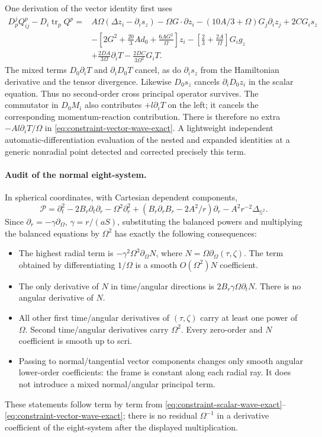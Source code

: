 One derivation of the vector identity first uses
\begin{align}
 D_p^jQ^p_{ij}-D_i\operatorname{tr}_pQ^p
 ={}&A\Omega(\Delta z_i-\partial_i s_z)
 -\Omega G\cdot\partial z_i
 -(10A/3+\Omega)G_j\partial_i z_j+2CG_is_z\\
&-\left[2G^2+\tfrac{20}{3}Ad_0+
                  \tfrac{6AG^2}\Omega\right]z_i
 -\left[\tfrac23+\tfrac{2A}\Omega\right]G_i g_z\\
&+\frac{2DA}{3\Omega}\partial_iT
 -\frac{2DC}{3\Omega^2}G_iT .
\end{align}
The mixed terms $D_0\partial_iT$ and $\partial_iD_0T$ cancel, as do
$\partial_i s_z$ from the Hamiltonian derivative and the tensor divergence.
Likewise $D_0s_z$ cancels $\partial_iD_0z_i$ in the scalar equation. Thus no
second-order cross principal operator survives.
The commutator in $D_0M_i$ also contributes $+l\partial_iT$ on the left;
it cancels the corresponding momentum-reaction contribution. There is
therefore no extra $-Al\partial_iT/\Omega$ in
\eqref{eq:constraint-vector-wave-exact}. A lightweight independent
automatic-differentiation evaluation of the nested and expanded identities
at a generic nonradial point detected and corrected precisely this term.

\paragraph{Audit of the normal eight-system.}
In spherical coordinates, with Cartesian dependent components,
\[
 \mathcal P=\partial_t^2-2B_r\partial_t\partial_r
 -\Omega^2\partial_r^2+
 (B_r\partial_rB_r-2A^2/r)\partial_r
 -A^2r^{-2}\Delta_{\mathbb S^2}.
\]
Since $\partial_r=-\gamma\partial_\Omega$,
$\gamma=r/(aS)$, substituting the balanced powers and multiplying the
balanced equations by $\Omega^2$ has exactly the following consequences:
\begin{itemize}
\item The highest radial term is $-\gamma^2\Omega^3\partial_\Omega N$,
where $N=\Omega\partial_\Omega(\tau,\zeta)$. The term obtained by
differentiating $1/\Omega$ is a smooth $O(\Omega^2)N$ coefficient.
\item The only derivative of $N$ in time/angular directions is
$2B_r\gamma\Omega\partial_tN$. There is no angular derivative of $N$.
\item All other first time/angular derivatives of $(\tau,\zeta)$ carry
at least one power of $\Omega$. Second time/angular derivatives carry
$\Omega^2$. Every zero-order and $N$ coefficient is smooth up to scri.
\item Passing to normal/tangential vector components changes only smooth
angular lower-order coefficients: the frame is constant along each radial
ray. It does not introduce a mixed normal/angular principal term.
\end{itemize}
These statements follow term by term from
\eqref{eq:constraint-scalar-wave-exact}--\eqref{eq:constraint-vector-wave-exact};
there is no residual $\Omega^{-1}$ in a derivative coefficient of the
eight-system after the displayed multiplication.

